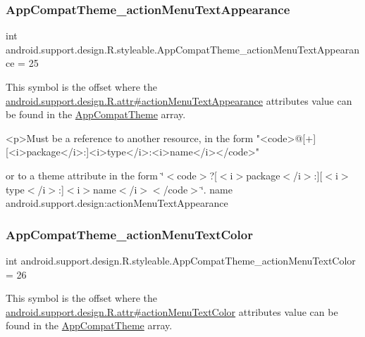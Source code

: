 \subsubsection{\texorpdfstring{App\+Compat\+Theme\+\_\+action\+Menu\+Text\+Appearance}{AppCompatTheme\_actionMenuTextAppearance}}
{\footnotesize\ttfamily int android.\+support.\+design.\+R.\+styleable.\+App\+Compat\+Theme\+\_\+action\+Menu\+Text\+Appearance = 25\hspace{0.3cm}{\ttfamily [static]}}

This symbol is the offset where the \hyperlink{classandroid_1_1support_1_1design_1_1R_1_1attr_abd2423af4cddf87be76d52972a8648de}{android.\+support.\+design.\+R.\+attr\#action\+Menu\+Text\+Appearance} attribute\textquotesingle{}s value can be found in the \hyperlink{classandroid_1_1support_1_1design_1_1R_1_1styleable_afb351dc8de20cbd4c89abe360373010c}{App\+Compat\+Theme} array.

\begin{DoxyVerb}      <p>Must be a reference to another resource, in the form "<code>@[+][<i>package</i>:]<i>type</i>:<i>name</i></code>"
\end{DoxyVerb}
 or to a theme attribute in the form \char`\"{}$<$code$>$?\mbox{[}$<$i$>$package$<$/i$>$\+:\mbox{]}\mbox{[}$<$i$>$type$<$/i$>$\+:\mbox{]}$<$i$>$name$<$/i$>$$<$/code$>$\char`\"{}.  name android.\+support.\+design\+:action\+Menu\+Text\+Appearance \mbox{\label{classandroid_1_1support_1_1design_1_1R_1_1styleable_a156db0d0e55cd2febf73892e2d0e20ad}} 
\subsubsection{\texorpdfstring{App\+Compat\+Theme\+\_\+action\+Menu\+Text\+Color}{AppCompatTheme\_actionMenuTextColor}}
{\footnotesize\ttfamily int android.\+support.\+design.\+R.\+styleable.\+App\+Compat\+Theme\+\_\+action\+Menu\+Text\+Color = 26\hspace{0.3cm}{\ttfamily [static]}}

This symbol is the offset where the \hyperlink{classandroid_1_1support_1_1design_1_1R_1_1attr_aa57a8ae5add076494a575c2c4bd55adb}{android.\+support.\+design.\+R.\+attr\#action\+Menu\+Text\+Color} attribute\textquotesingle{}s value can be found in the \hyperlink{classandroid_1_1support_1_1design_1_1R_1_1styleable_afb351dc8de20cbd4c89abe360373010c}{App\+Compat\+Theme} array.

